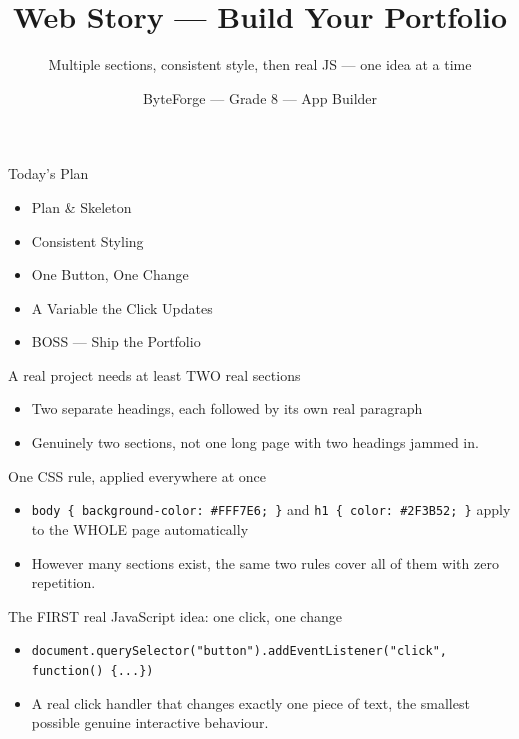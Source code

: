 \documentclass[aspectratio=169]{beamer}
\title{Web Story — Build Your Portfolio}
\subtitle{Multiple sections, consistent style, then real JS — one idea at a time}
\author{ByteForge --- Grade 8 --- App Builder}
\date{}
\begin{document}
\begin{frame}
    \titlepage
\end{frame}

\begin{frame}{Today's Plan}
    \begin{itemize}
        \item Plan \& Skeleton
        \item Consistent Styling
        \item One Button, One Change
        \item A Variable the Click Updates
        \item[$\bigstar$] BOSS --- Ship the Portfolio
    \end{itemize}
\end{frame}

\begin{frame}{A real project needs at least TWO real sections}
    \large
    \begin{itemize}
        \item Two separate headings, each followed by its own real paragraph
        \item Genuinely two sections, not one long page with two headings jammed in.
    \end{itemize}
\end{frame}


\begin{frame}{One CSS rule, applied everywhere at once}
    \large
    \begin{itemize}
        \item \texttt{body \{ background-color: \#FFF7E6; \}} and \texttt{h1 \{ color: \#2F3B52; \}} apply to the WHOLE page automatically
        \item However many sections exist, the same two rules cover all of them with zero repetition.
    \end{itemize}
\end{frame}


\begin{frame}{The FIRST real JavaScript idea: one click, one change}
    \large
    \begin{itemize}
        \item \texttt{document.querySelector("button").addEventListener("click", function() \{...\})}
        \item A real click handler that changes exactly one piece of text, the smallest possible genuine interactive behaviour.
    \end{itemize}
\end{frame}
\end{document}
